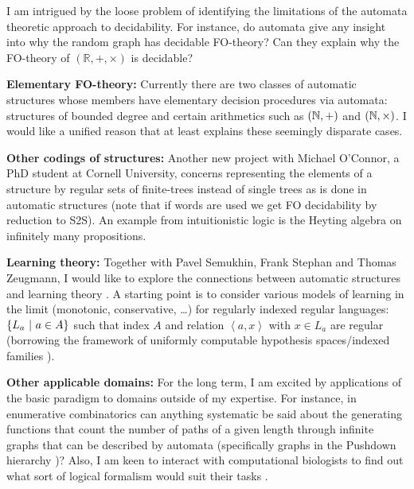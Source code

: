 \documentclass[11pt]{article}
\theoremstyle{plain} \numberwithin{equation}{section}
\theoremstyle{definition}
\begin{document}
I am intrigued by the loose problem of identifying the limitations of the
automata theoretic approach to decidability. For instance, do automata give any
insight into why the random graph has decidable FO-theory? 
Can they explain why the FO-theory of $(\mathbb{R},+,\times)$ is
decidable?



\noindent
{\bf Elementary FO-theory:} Currently there are two classes of automatic structures whose members have elementary decision procedures via automata: structures of bounded degree \cite{Lohr03} and certain arithmetics such as $({\mathbb N},+)$ and $({\mathbb N},\times)$. I would like a unified reason that at least explains these seemingly disparate cases.

\noindent
{\bf Other codings of structures:} Another new project with Michael O'Connor, a PhD student at Cornell University, concerns representing the elements of a structure by regular sets of finite-trees instead of single trees as is done in automatic structures (note that if words are used we get FO decidability by reduction to S2S).
An example from intuitionistic logic is the Heyting algebra on infinitely many propositions.

\noindent
{\bf Learning theory:} Together with Pavel Semukhin, Frank Stephan and Thomas Zeugmann, I would like to explore the connections between automatic structures and learning theory \cite{gold67, angl80}. A starting point is to consider various models of learning in the limit (monotonic, conservative, \ldots) for regularly indexed regular languages: $\{L_a \ \vert \  a \in A\}$ such that index $A$ and relation $\left<a,x\right>$ with $x \in L_a$ are regular (borrowing the framework of uniformly computable hypothesis spaces/indexed families \cite{angl80, LaZe95}).

\noindent
{\bf Other applicable domains:} For the long term, I am excited by applications of the basic paradigm to domains outside of my expertise. For instance, in enumerative combinatorics can anything systematic be said about the generating functions that count the number of paths of a given length through infinite graphs that can be described by automata (specifically graphs in the Pushdown hierarchy \cite{Thom03})? Also, I am keen to interact with computational biologists to find out what sort of logical formalism would suit their tasks \cite{Hare04, FiHe06}.
\end{document}
